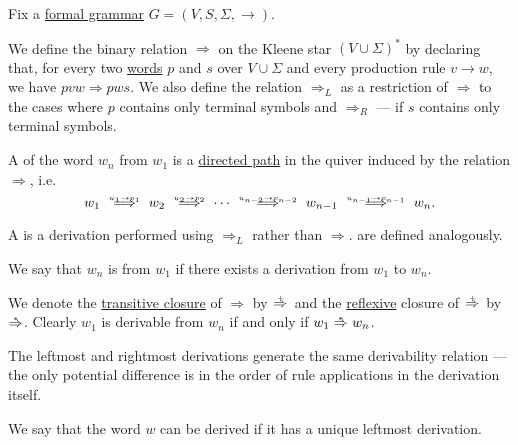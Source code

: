 \begin{definition}\label{def:grammar_derivation}
  Fix a \hyperref[def:formal_grammar]{formal grammar} \( G = (V, S, \Sigma, \to) \).

  \begin{thmenum}
     We define the binary relation \( \Rightarrow \) on the Kleene star \( (V \cup \Sigma)^* \) by declaring that, for every two \hyperref[def:formal_language/word]{words} \( p \) and \( s \) over \( V \cup \Sigma \) and every production rule \( v \to w \), we have \( pvw \Rightarrow pws \). We also define the relation \( \Rightarrow_L \) as a restriction of \( \Rightarrow \) to the cases where \( p \) contains only terminal symbols and \( \Rightarrow_R \) --- if \( s \) contains only terminal symbols.

    A  of the word \( w_n \) from \( w_1 \) is a \hyperref[def:quiver_path/directed]{directed path} in the quiver induced by the relation \( \Rightarrow \), i.e.
    \begin{equation}\label{eq:def:grammar_derivation/derivation}
      w_1
      \reloset {u_1 \to v_1} \implies
      w_2
      \reloset {u_2 \to v_2} \implies
      \cdots
      \reloset {u_{n-2} \to v_{n-2}} \implies
      w_{n-1}
      \reloset {u_{n-1} \to v_{n-1}} \implies
      w_n.
    \end{equation}

    A  is a derivation performed using \( \Rightarrow_L \) rather than \( \Rightarrow \).  are defined analogously.

    We say that \( w_n \) is  from \( w_1 \) if there exists a derivation from \( w_1 \) to \( w_n \).

    We denote the \hyperref[def:relation_closures/transitive]{transitive closure} of \( \Rightarrow \) by \( \reloset + \Rightarrow \) and the \hyperref[def:relation_closures/reflexive]{reflexive} closure of \( \reloset + \Rightarrow \) by \( \reloset {*} \Rightarrow \). Clearly \( w_1 \) is derivable from \( w_n \) if and only if \( w_1 \reloset {*} \Rightarrow w_n \).

    The leftmost and rightmost derivations generate the same derivability relation --- the only potential difference is in the order of rule applications in the derivation itself.

     We say that the word \( w \) can be derived  if it has a unique leftmost derivation.


\end{thmenum}
\end{definition}
